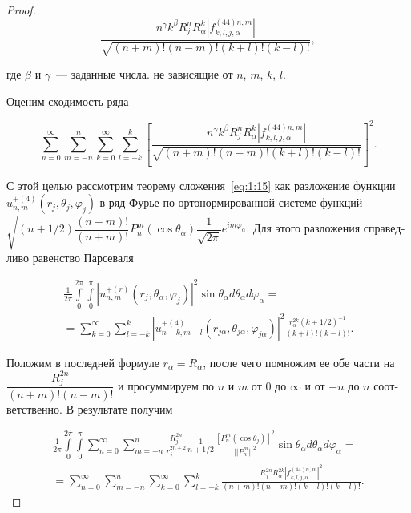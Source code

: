 \begin{russian}
\begin{proof}
\begin{equation}
\frac{{{n^\gamma }{k^\beta }R_j^nR_\alpha^k\left| {f_{k,l,j,\alpha}^{(44)n,m}} \right|}}{{\sqrt {(n + m)!(n - m)!(k + l)!(k - l)!} }},
\end{equation}

\noindent где $\beta$ и $\gamma$~--- заданные числа. не зависящие от $n$, $m$, $k$, $l$.

Оценим сходимость ряда

\begin{equation}
\sum\limits_{n = 0}^\infty  {\sum\limits_{m =  - n}^n {\sum\limits_{k = 0}^\infty  {\sum\limits_{l =  - k}^k {{{\left[ {\frac{{{n^\gamma }{k^\beta }R_j^nR_\alpha^k\left| {f_{k,l,j,\alpha}^{(44)n,m}} \right|}}{{\sqrt {(n + m)!(n - m)!(k + l)!(k - l)!} }}} \right]}^2}}}}}.
\label{eq:8:24}
\end{equation}

С этой целью рассмотрим теорему сложения~\eqref{eq:1:15} как разложение функции $u_{n,m}^{+(4)}(r_j,\theta_j,\varphi_j)$ в ряд Фурье по ортонормированной системе функций $\sqrt {(n + 1/2)\dfrac{{(n - m)!}}{{(n + m)!}}} P_n^m(\cos {\theta _\alpha})\dfrac{1}{{\sqrt {2\pi } }}{e^{im{\varphi _\alpha}}}$. Для этого разложения справедливо равенство Парсеваля

\begin{multline}
\frac{1}{{2\pi }}\int\limits_0^{2\pi } {\int\limits_0^\pi  {{{\left| {u_{n,m}^{ + (r)}\left( {{r_j},{\theta _\alpha},{\varphi _j}} \right)} \right|}^2}} } \sin {\theta _\alpha}d{\theta _\alpha}d{\varphi _\alpha} = \\
= \sum\limits_{k = 0}^\infty  {\sum\limits_{l =  - k}^k {{{\left| {u_{n + k,m - l}^{ + (4)}\left( {{r_{j\alpha}},{\theta _{j\alpha}},{\varphi _{j\alpha}}} \right)} \right|}^2}} } \frac{{r_\alpha^{2k}{{\left( {k + 1/2} \right)}^{ - 1}}}}{{(k + l)!(k - l)!}}.
\end{multline}

Положим в последней формуле $r_\alpha=R_\alpha$, после чего помножим ее обе части на $\dfrac{R_j^{2n}}{(n+m)!(n-m)!}$ и просуммируем по $n$ и $m$ от $0$ до $\infty$ и от $-n$ до $n$ соответственно. В результате получим

\begin{multline}
\frac{1}{{2\pi }}\int\limits_0^{2\pi } {\int\limits_0^\pi  {\sum\limits_{n = 0}^\infty  {\sum\limits_{m =  - n}^n {\frac{{R_j^{2n}}}{{r_j^{2n + 2}}}} } } } \frac{1}{{n + 1/2}}\frac{{{{\left[ {P_n^m(\cos {\theta _j})} \right]}^2}}}{{||P_n^m|{|^2}}}\sin {\theta _\alpha}d{\theta _\alpha}d{\varphi _\alpha} = \\
= \sum\limits_{n = 0}^\infty  {\sum\limits_{m =  - n}^n {\sum\limits_{k = 0}^\infty  {\sum\limits_{l =  - k}^k {\frac{{R_j^{2n}R_\alpha^{2k}{{\left| {f_{k,l,j,\alpha}^{(44)n,m}} \right|}^2}}}{{(n + m)!(n - m)!(k + l)!(k - l)!}}} } } }.
\label{eq:8:23}
\end{multline}


\end{proof}
\end{russian}
